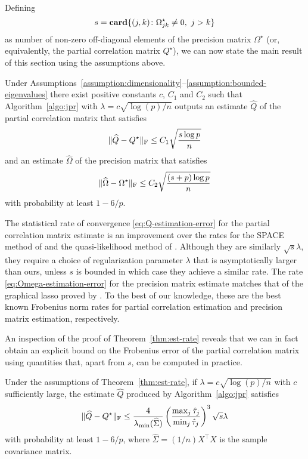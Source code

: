 \documentclass{article}
\begin{document}
Defining
\[
    s = \mathop{\bf card}\{(j,k) \colon \Omega^\star_{jk} \neq 0,\ j > k\}    
\]
as number of non-zero off-diagonal elements of the precision matrix
$\Omega^\star$ (or, equivalently, the partial correlation matrix $Q^\star$), we
can now state the main result of this section using the assumptions above.

\begin{theorem}\label{thm:est-rate}
Under
Assumptions~\ref{assumption:dimensionality}--\ref{assumption:bounded-eigenvalues}
there exist positive constants $c$, $C_1$ and $C_2$ such that
Algorithm~\ref{algo:jpr} with $\lambda = c\sqrt{\log(p)/n}$ outputs an estimate
$\widehat{Q}$ of the partial correlation matrix that satisfies
\begin{equation}\label{eq:Q-estimation-error}
    \|\widehat{Q} - Q^\star\|_{\rm F} \leq C_1 \sqrt{\frac{s\log p}{n}}    
\end{equation}
and an estimate $\widehat{\Omega}$ of the precision matrix that satisfies
\begin{equation}\label{eq:Omega-estimation-error}
    \|\widehat{\Omega} - \Omega^\star\|_{\rm F} \leq C_2 \sqrt{\frac{(s+p)\log p}{n}}
\end{equation}
with probability at least $1 - 6/p$.
\end{theorem}

The statistical rate of convergence \eqref{eq:Q-estimation-error} for the
partial correlation matrix estimate is an improvement over the rates for the
SPACE method of \cite{Peng09} and the quasi-likelihood method of
\cite{Khare15}. Although they are similarly $\sqrt{s} \lambda$, they require a
choice of regularization parameter $\lambda$ that is asymptotically larger than
ours, unless $s$ is bounded in which case they achieve a similar rate. The rate
\eqref{eq:Omega-estimation-error} for the precision matrix estimate matches
that of the graphical lasso proved by \cite{Rothman08}. To the best of our
knowledge, these are the best known Frobenius norm rates for partial
correlation estimation and precision matrix estimation, respectively.

An inspection of the proof of Theorem~\ref{thm:est-rate} reveals that we can in
fact obtain an explicit bound on the Frobenius error of the partial correlation
matrix using quantities that, apart from $s$, can be computed in practice.

\begin{corollary}
Under the assumptions of Theorem~\ref{thm:est-rate}, if $\lambda =
c\sqrt{\log(p)/n}$ with $c$ sufficiently large, the estimate $\widehat{Q}$
produced by Algorithm~\ref{algo:jpr} satisfies
\[
    \|\widehat{Q} - Q^\star\|_{\rm F} \leq \frac{4}{\lambda_\mathrm{min}(\widehat{\Sigma})}\left(\frac{\max_j \hat \tau_j}{\min_j \hat \tau_j}\right)^3 \sqrt{s}\lambda 
\]
with probability at least $1 - 6/p$, where $\widehat{\Sigma} = (1/n) X^\top X$
is the sample covariance matrix.
\end{corollary}
\end{document}
